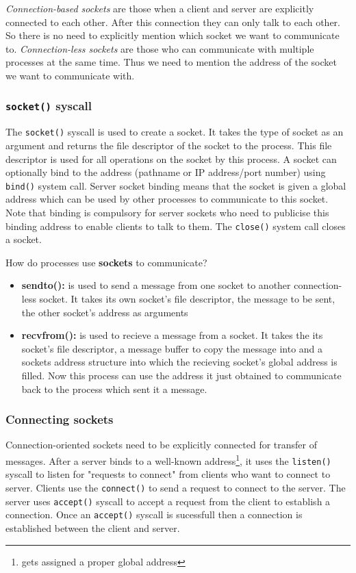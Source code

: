 \documentclass[12pt]{article}
\newcommand{\tbox}[1]{\noindent\fbox{\parbox{\textwidth}{#1}}}
\begin{document}
\textit{Connection-based sockets} are those when a client and server are explicitly connected to each other. After this connection they can only talk to each other. So there is no need to explicitly mention which socket we want to communicate to.
\textit{Connection-less sockets} are those who can communicate with multiple processes at the same time. Thus we need to mention the address of the socket we want to communicate with. 


\subsubsection{\texttt{socket()} syscall}
The \texttt{socket()} syscall is used to create a socket. It takes the type of socket as an argument and returns the file descriptor of the socket to the process. This file descriptor 
is used for all operations on the socket by this process. A socket can optionally bind to the address (pathname or IP address/port number) using \texttt{bind()} system call. 
Server socket binding means that the socket is given a global address which can be used by other processes to communicate to this socket. Note that binding is compulsory for server sockets who need to 
publicise this binding address to enable clients to talk to them. The \texttt{close()} system call closes a socket.


How do processes use \textbf{sockets} to communicate?
\begin{itemize}
    \item \textbf{sendto():} is used to send a message from one socket to another connection-less socket. It takes its own socket's file descriptor, the message to be sent, the other socket's address as arguments
    \item \textbf{recvfrom():} is used to recieve a message from a socket. It takes the its socket's file descriptor, a message buffer to copy the message into and a sockets address structure into which the recieving socket's
    global address is filled. Now this process can use the address it just obtained to communicate back to the process which sent it a message. 
\end{itemize}

\noindent\tbox{
    \begin{center}
    \textbf{\Huge Lecture 11}
    \end{center}
}
\subsubsection*{Connecting sockets}
Connection-oriented sockets need to be explicitly connected for transfer of messages.
After a server binds to a well-known address\footnote{gets assigned a proper global address}, it uses the \texttt{listen()} syscall to listen
for "requests to connect" from clients who want to connect to server. Clients use the \texttt{connect()} to send a request to connect to the server. The server
uses \texttt{accept()} syscall to accept a request from the client to establish a connection. Once an \texttt{accept()} syscall is sucessfull then a connection
is established between the client and server. 
\end{document}
